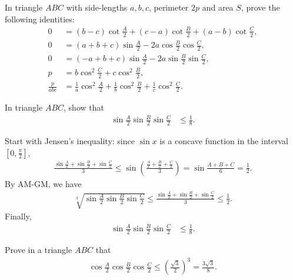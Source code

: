 \documentclass[12pt,a4paper]{memoir}
\theoremstyle{definition}
\begin{document}
\begin{question}
	In triangle $ABC$ with side-lengths $a,b,c$, perimeter $2p$ and area $S$, prove the following identities:
	\begin{align*}
		0 &= (b-c)\cot\frac{A}{2}+(c-a)\cot\frac{B}{2}+(a-b)\cot\frac{C}{2},\\
		0 &= (a+b+c)\sin\frac{A}{2} - 2 a \cos\frac{B}{2}\cos\frac{C}{2},\\
		0 &= (-a+b+c)\sin\frac{A}{2} - 2 a \sin\frac{B}{2}\sin\frac{C}{2},\\
		p &= b\cos^2 \frac{C}{2} + c\cos^2 \frac{B}{2},\\
		\frac{p}{abc} &= \frac{1}{a}\cos^2\frac{A}{2}+\frac{1}{b}\cos^2\frac{B}{2}+\frac{1}{c}\cos^2\frac{C}{2}.
	\end{align*}
\end{question}


\begin{question}
	In triangle $ABC$, show that
	\begin{align}
		\sin{\frac{A}{2}}\sin{\frac{B}{2}}\sin{\frac{C}{2}} &\le \frac{1}{8}.\label{Q2}
	\end{align}
\end{question}

\begin{solution}
	Start with Jensen's inequality: since $\sin x$ is a concave function in the interval $\left[0, \frac{\pi}{2}\right]$,
	\begin{align*}
		\frac{\sin \frac A2 + \sin \frac B2 + \sin \frac C2 }{3} \leq \sin\left(\frac{\frac A2 + \frac B2 + \frac C2}{3}\right) = \sin \frac{A+B+C}{6} = \frac 12.
	\end{align*}
	By AM-GM, we have
	\begin{align*}
		\sqrt[3]{\sin\frac{A}{2}\sin\frac{B}{2}\sin\frac{C}{2}} \leq \frac{\sin \frac A2 + \sin \frac B2 + \sin \frac C2 }{3} \leq \frac{1}{2}.
	\end{align*}
	Finally,
	\begin{align*}
		\sin{\frac{A}{2}}\sin{\frac{B}{2}}\sin{\frac{C}{2}} &\le \frac{1}{8}.
	\end{align*}
\end{solution}

\begin{question}
	Prove in a triangle $ABC$ that
	\begin{align*}
		\cos\frac{A}{2}\cos\frac{B}{2}\cos\frac{C}{2} \leq \left(\frac{\sqrt{3}}{2}\right)^3 = \frac{3\sqrt{3}}{8}.
	\end{align*}
\end{question}
\end{document}

